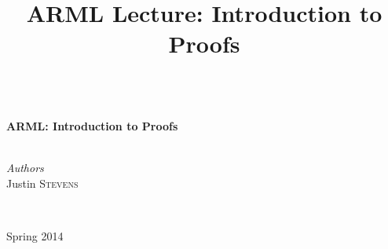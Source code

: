
\title{ARML Lecture:  Introduction to Proofs}

\begin{center}
\HRule \\[0.4cm]
{ \huge \bfseries ARML: Introduction to Proofs}\\[0.4cm] %
\HRule \\[1.5cm]
\begin{minipage}{0.4\textwidth}
\begin{flushleft} \large
\emph{Authors}\\
Justin \textsc{Stevens} \newline
\end{flushleft}
\end{minipage}
~
\begin{minipage}{0.4\textwidth}
\begin{flushright} \large
Spring 2014
\end{flushright}
\end{minipage}\\[0.5cm]
\end{center}

